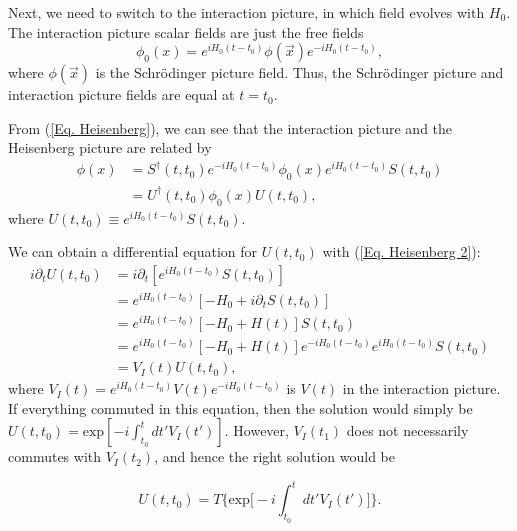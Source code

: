 \documentclass[11pt]{article}
\theoremstyle{definition}
\begin{document}
Next, we need to switch to the interaction picture, in which field evolves with $H_0$. The interaction picture scalar fields are just the free fields
\begin{equation}
    \phi_0(x) = e^{iH_0(t-t_0)}\phi(\vec{x})e^{-iH_0(t-t_0)},
\end{equation}
where $\phi(\vec{x})$ is the Schrödinger picture field. Thus, the Schrödinger picture and interaction picture fields are equal at $t = t_0$.

From (\ref{Eq. Heisenberg}), we can see that the interaction picture and the Heisenberg picture are related by
\begin{equation}
\begin{aligned}
        \phi(x) &= S^\dagger(t, t_0)e^{-iH_0(t-t_0)}\phi_0(x)e^{iH_0(t-t_0)}S(t,t_0)\\
        &= U^\dagger(t,t_0)\phi_0(x)U(t,t_0),
        \label{Eq. HD phi define}
\end{aligned}
\end{equation}
where $U(t,t_0) \equiv e^{iH_0(t-t_0)}S(t,t_0)$.

We can obtain a differential equation for $U(t, t_0)$ with (\ref{Eq. Heisenberg 2}):
\begin{equation}
    \begin{aligned}
        i\partial_tU(t,t_0) &= i\partial_t[e^{iH_0(t-t_0)}S(t,t_0)]\\
        &=e^{iH_0(t-t_0)}[-H_0 + i\partial_tS(t,t_0)]\\
        &=e^{iH_0(t-t_0)}[-H_0 + H(t)]S(t,t_0)\\
        &=e^{iH_0(t-t_0)}[-H_0 + H(t)]e^{-iH_0(t-t_0)}e^{iH_0(t-t_0)}S(t,t_0)\\
        &=V_I(t)U(t,t_0),
    \end{aligned}
\end{equation}
where $V_I(t) = e^{iH_0(t-t_0)}V(t)e^{-iH_0(t-t_0)}$ is $V(t)$ in the interaction picture. If everything commuted in this equation, then the solution would simply be $U(t, t_0) = \text{exp}[-i\int^t_{t_0} dt' V_I(t') ]$. However, $V_I(t_1)$ does not necessarily commutes with $V_I(t_2)$, and hence the right solution would be
\begin{shaded}
    \begin{equation}
        U(t, t_0) = T\biggr\{\text{exp}\biggr[-i\int^t_{t_0} dt' V_I(t') \biggr]\biggr\}.
        \label{Eq. U}
    \end{equation}
\end{shaded}
\end{document}
